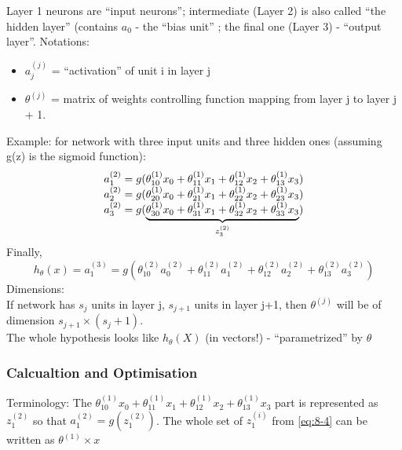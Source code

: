 \documentclass{scrartcl}
\begin{document}
Layer 1 neurons are ``input neurons''; intermediate (Layer 2) is also
called ``the hidden layer'' (contains $a_0$ - the ``bias unit'' ; the
final one (Layer 3) - ``output layer''. Notations:
\begin{itemize}
\item {$a_j^{(j)}$} = ``activation'' of unit i in layer j
\item {$\theta^{(j)}$} = matrix of weights controlling function
  mapping from layer j to layer j + 1.
\end{itemize}
Example: for network with three input units and three hidden ones
(assuming g(z) is the sigmoid function):
\begin{equation}
  \label{eq:8-4}
  \begin{array}[c]{c}
    a_1^{(2)} = g(\theta_{10}^{(1)}x_0 + \theta_{11}^{(1)}x_1 +
    \theta_{12}^{(1)}x_2 + \theta_{13}^{(1)}x_3)  \\
    a_2^{(2)} = g(\theta_{20}^{(1)}x_0 + \theta_{21}^{(1)}x_1 +
    \theta_{22}^{(1)}x_2 + \theta_{23}^{(1)}x_3)  \\
    a_3^{(2)} = g(\underbrace{\theta_{30}^{(1)}x_0 + \theta_{31}^{(1)}x_1 +
      \theta_{32}^{(1)}x_2 + \theta_{33}^{(1)}x_3}_{z_3^{(2)}})
  \end{array}
\end{equation}
Finally,
\[ h_\theta(x) = a_1^{(3)} = g(\theta_{10}^{(2)}a_0^{(2)} +
\theta_{11}^{(2)}a_1^{(2)} + \theta_{12}^{(2)}a_2^{(2)} +
\theta_{13}^{(2)}a_3^{(2)} )\]
Dimensions: \\
If network has $s_j$ units in layer j, $s_{j+1}$ units in layer j+1,
then $\theta^{(j)}$ will be of dimension $s_{j+1} \times (s_j + 1)$.
\\
The whole hypothesis looks like $h_\theta (X)$ (in vectors!) -
``parametrized'' by $\theta$
\label{8-4}
 
\subsubsection{Calcualtion and Optimisation}
Terminology: The $\theta_{10}^{(1)}x_0 + \theta_{11}^{(1)}x_1 +
\theta_{12}^{(1)}x_2 + \theta_{13}^{(1)}x_3$ part is represented as
$z_1^{(2)}$ so that $a_1^{(2)} = g(z_1^{(2)})$.
The whole set of $z_1^{(i)}$ from \ref{eq:8-4} can be written as
$\theta^{(1)} \times x$
\end{document}

